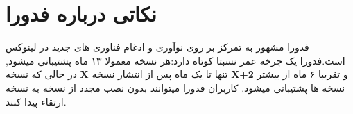 \section{نکاتی درباره فدورا}\label{se-119}
فدورا مشهور به تمرکز بر روی نوآوری و ادغام فناوری های جدید در لینوکس است.فدورا یک چرخه عمر نسبتا کوتاه دارد:هر نسخه معمولا ۱۳ ماه پشتیبانی میشود, در حالی که نسخه \textbf{X} تنها تا یک ماه پس از انتشار نسخه \textbf{X+2} و تقریبا ۶ ماه از بیشتر نسخه ها پشتیبانی میشود. کاربران فدورا میتوانند بدون نصب مجدد از نسخه به نسخه ارتقاء پیدا کنند.
\cite{wiki-fedora}